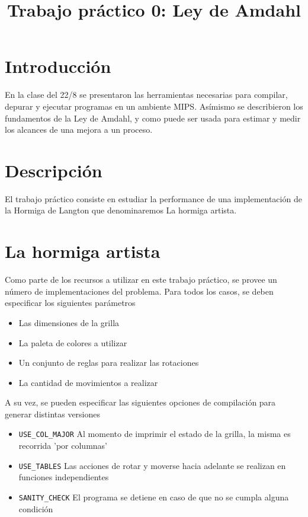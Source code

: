 \documentclass{article}
\author{}
\title{Trabajo práctico 0: Ley de Amdahl}
\begin{document}
\date{}
\maketitle

\section{Introducción}

En la clase del 22/8 se presentaron las herramientas necesarias para compilar, depurar y ejecutar programas en un 
ambiente MIPS. Asímismo se describieron los fundamentos de la Ley de Amdahl, y como puede ser usada para estimar
y medir los alcances de una mejora a un proceso.

\section{Descripción}
El trabajo práctico consiste en estudiar la performance de una implementación de la Hormiga de Langton que denominaremos
La hormiga artista.
\pagebreak

\section{La hormiga artista}

Como parte de los recursos a utilizar en este trabajo práctico, se provee un número de implementaciones del problema.
Para todos los casos, se deben especificar los siguientes parámetros
\begin{itemize}
\item Las dimensiones de la grilla
\item La paleta de colores a utilizar
\item Un conjunto de reglas para realizar las rotaciones
\item La cantidad de movimientos a realizar
\end{itemize}

A su vez, se pueden especificar las siguientes opciones de compilación para generar distintas versiones
\begin{itemize}
\item \texttt{USE\_COL\_MAJOR}
Al momento de imprimir el estado de la grilla, la misma es recorrida 'por columnas'
\item \texttt{USE\_TABLES}
Las acciones de rotar y moverse hacia adelante se realizan en funciones independientes
\item \texttt{SANITY\_CHECK}
El programa se detiene en caso de que no se cumpla alguna condición
\end{itemize}
\end{document}

